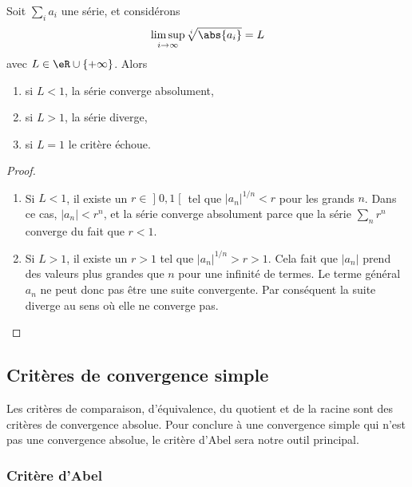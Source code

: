\begin{proposition}
    Soit $\sum_i a_i$ une série, et considérons
    \begin{equation*}
      \limsup_{i \rightarrow \infty} \sqrt[i]{\abs{a_i}} = L
    \end{equation*}
    avec \( L\in \eR\cup\{ +\infty \}\). Alors
    \begin{enumerate}
    \item si $L < 1$, la série converge absolument,
    \item si $L> 1$, la série diverge,
    \item si $L = 1$ le critère échoue.
    \end{enumerate}
\end{proposition}

\begin{proof}
    \begin{enumerate}
        \item
            Si $L<1$, il existe un $r\in \mathopen] 0 , 1 \mathclose[$ tel que $| a_n |^{1/n}<r$ pour les grands $n$. Dans ce cas, $| a_n |<r^{n}$, et la série converge absolument parce que la série $\sum_nr^n$ converge du fait que $r<1$.
        \item
            Si $L>1$, il existe un $r>1$ tel que $| a_n |^{1/n}>r>1$. Cela fait que $| a_n |$ prend des valeurs plus grandes que $n$ pour une infinité de termes. Le terme général $a_n$ ne peut donc pas être une suite convergente. Par conséquent la suite diverge au sens où elle ne converge pas.

    \end{enumerate}
\end{proof}

\subsection{Critères de convergence simple}

Les critères de comparaison, d'équivalence, du quotient et de la racine sont des critères de convergence absolue. Pour conclure à une convergence simple qui n'est pas une convergence absolue, le critère d'Abel sera notre outil principal.

\subsubsection{Critère d'Abel}


